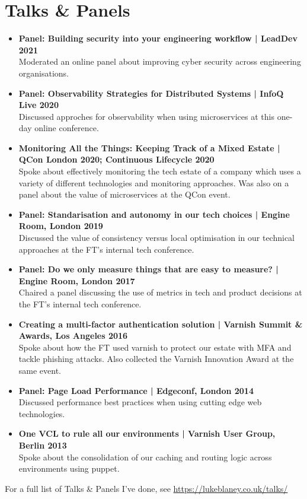 \documentclass[a4paper]{article}
\begin{document}
\section*{Talks \& Panels}
\begin{itemize}

\item{\bf Panel: Building security into your engineering workflow | LeadDev 2021}\\
Moderated an online panel about improving cyber security across engineering organisations.
\item{\bf Panel: Observability Strategies for Distributed Systems | InfoQ Live 2020}\\
Discussed approches for observability when using microservices at this one-day online conference.
\item{\bf Monitoring All the Things: Keeping Track of a Mixed Estate | QCon London 2020; Continuous Lifecycle 2020}\\
Spoke about effectively monitoring the tech estate of a company which uses a variety of different technologies and monitoring approaches.  Was also on a panel about the value of microservices at the QCon event.
\item{\bf Panel: Standarisation and autonomy in our tech choices | Engine Room, London 2019}\\
Discussed the value of consistency versus local optimisation in our technical approaches at the FT's internal tech conference.
\item{\bf Panel: Do we only measure things that are easy to measure? | Engine Room, London 2017}\\
Chaired a panel discussing the use of metrics in tech and product decisions at the FT's internal tech conference.
\item{\bf Creating a multi-factor authentication solution | Varnish Summit \& Awards, Los Angeles 2016}\\
Spoke about how the FT used varnish to protect our estate with MFA and tackle phishing attacks.  Also collected the Varnish Innovation Award at the same event.
\item{\bf Panel: Page Load Performance | Edgeconf, London 2014 }\\
Discussed performance best practices when using cutting edge web technologies.
\item{\bf One VCL to rule all our environments | Varnish User Group, Berlin 2013}\\
Spoke about the consolidation of our caching and routing logic across environments using puppet.
\end{itemize}
For a full list of Talks \& Panels I've done, see \url{https://lukeblaney.co.uk/talks/}
\end{document}
